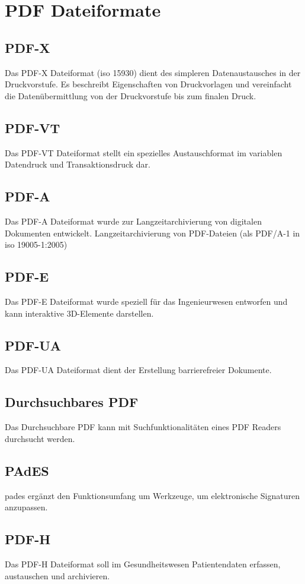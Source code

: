 \section{PDF Dateiformate}

\subsection{PDF-X}
Das PDF-X Dateiformat (\gls{iso} 15930) dient des simpleren Datenaustausches in der Druckvorstufe. Es beschreibt Eigenschaften von Druckvorlagen und vereinfacht die Datenübermittlung von der Druckvorstufe bis zum finalen Druck.

\subsection{PDF-VT}
Das PDF-VT Dateiformat stellt ein spezielles Austauschformat im variablen Datendruck und Transaktionsdruck dar.

\subsection{PDF-A}
Das PDF-A Dateiformat wurde zur Langzeitarchivierung von digitalen Dokumenten entwickelt.
Langzeitarchivierung von PDF-Dateien (als PDF/A-1 in \gls{iso} 19005-1:2005) 

\subsection{PDF-E}
Das PDF-E Dateiformat wurde speziell für das Ingenieurwesen entworfen und kann interaktive 3D-Elemente darstellen.

\subsection{PDF-UA}
Das PDF-UA Dateiformat dient der Erstellung barrierefreier Dokumente.

\subsection{Durchsuchbares PDF}
Das Durchsuchbare PDF kann mit Suchfunktionalitäten eines PDF Readers durchsucht werden.

\subsection{PAdES}
\gls{pades} ergänzt den Funktionsumfang um Werkzeuge, um elektronische Signaturen anzupassen.

\subsection{PDF-H}
Das PDF-H Dateiformat soll im Gesundheitswesen Patientendaten erfassen, austauschen und archivieren.
